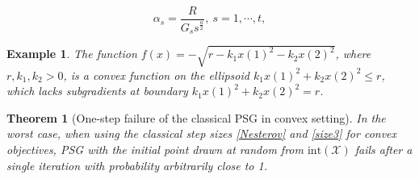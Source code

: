 \documentclass[10pt,a4paper]{amsart}
\newtheorem{example}{Example}
\newtheorem{theorem}{Theorem}
\begin{document}
\begin{equation}
	\alpha_s=\frac{R}{G_s s^{\frac{a}{2}}}, ~s=1,\cdots,t,\label{size3}
\end{equation}

\begin{example}\label{e1}
	The function $f(x)=-\sqrt{r - k_1x(1)^2-k_2x(2)^2}$, where $r, k_1, k_2 > 0$, is a convex function on the ellipsoid $k_1x(1)^2+k_2x(2)^2\le r$, which lacks subgradients at boundary $k_1x(1)^2+k_2x(2)^2= r$.
\end{example}

\begin{theorem}[One-step failure of the classical PSG in convex setting]\label{thm2.1}
	In the worst case, when using the classical step sizes \eqref{Nesterov} and \eqref{size3} for convex objectives, PSG with the initial point drawn at random from $\text{int}(\mathcal{X})$ fails after a single iteration with probability arbitrarily close to 1.
\end{theorem}
\end{document}
